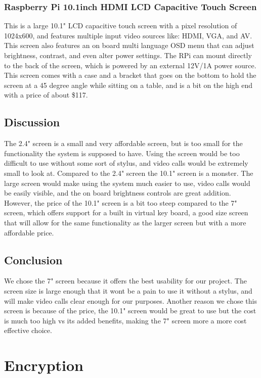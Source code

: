 \documentclass[onecolumn, draftclsnofoot,10pt, compsoc]{IEEEtran}
\begin{document}
\subsubsection{Raspberry Pi 10.1inch HDMI LCD Capacitive Touch Screen}
This is a large 10.1" LCD capacitive touch screen with a pixel resolution of 1024x600, and features multiple input video sources like: HDMI, VGA, and AV. This screen also features an on board multi language OSD menu that can adjust brightness, contrast, and even alter power settings. The RPi can mount directly to the back of the screen, which is powered by an external 12V/1A power source. This screen comes with a case and a bracket that goes on the bottom to hold the screen at a 45 degree angle while sitting on a table, and is a bit on the high end with a price of about \$117.
 



\subsection{Discussion}
The 2.4" screen is a small and very affordable screen, but is too small for the functionality the system is supposed to have. Using the screen would be too difficult to use without some sort of stylus, and video calls would be extremely small to look at. Compared to the 2.4" screen the 10.1" screen is a monster. The large screen would make using the system much easier to use, video calls would be easily visible, and the on board brightness controls are great addition. However, the price of the 10.1" screen is a bit too steep compared to the 7" screen, which offers support for a built in virtual key board, a good size screen that will allow for the same functionality as the larger screen but with a more affordable price.

\subsection{Conclusion}
We chose the 7" screen because it offers the best usability for our project. The screen size is large enough that it wont be a pain to use it without a stylus, and will make video calls clear enough for our purposes. Another reason we chose this screen is because of the price, the 10.1" screen would be great to use but the cost is much too high vs its added benefits, making the 7" screen more a more cost effective choice.




\section{Encryption}
\end{document}
